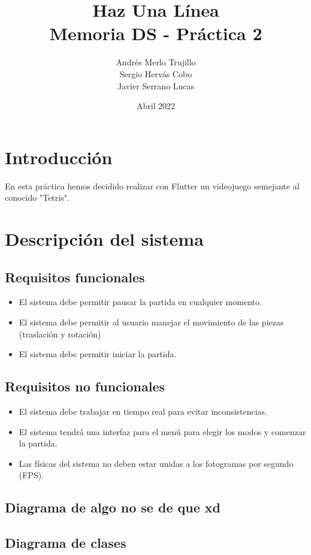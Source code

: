 \documentclass{article}
\title{Haz Una Línea\\
\large Memoria DS - Práctica 2}
\author{Andrés Merlo Trujillo\\ Sergio Hervás Cobo\\ Javier Serrano Lucas}
\date{Abril 2022}
\begin{document}
\maketitle
\section{Introducción}
En esta práctica hemos decidido realizar con Flutter un videojuego semejante al conocido "Tetris".

\section{Descripción del sistema}
\subsection{Requisitos funcionales} 
\begin{itemize}
    \item El sistema debe permitir pausar la partida en cualquier
    momento.
    \item El sistema debe permitir al usuario manejar el movimiento de
    las piezas (traslación y rotación)
    \item El sistema debe permitir iniciar la partida.
\end{itemize}
\subsection{Requisitos no funcionales}
\begin{itemize}
    \item El sistema debe trabajar en tiempo real para evitar
    inconsistencias.
    \item El sistema tendrá una interfaz para el menú para elegir los
modos y comenzar la partida.
    \item Las físicas del sistema no deben estar unidas a los fotogramas
por segundo (FPS).
\end{itemize}
\subsection{Diagrama de algo no se de que xd}
\subsection{Diagrama de clases}
\end{document}
